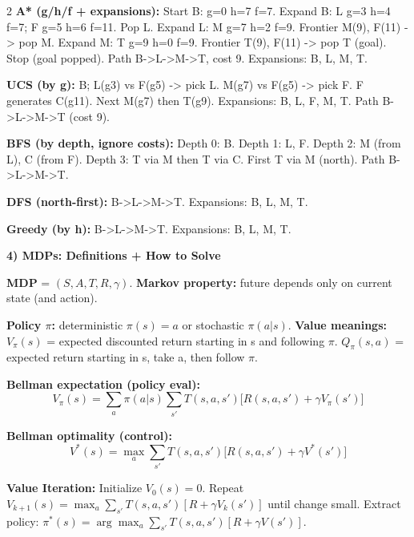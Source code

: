 \documentclass[10pt]{article}
\begin{document}
\begin{multicols*}{2}
\textbf{A* (g/h/f + expansions):}\newline
Start B: g=0 h=7 f=7.\newline
Expand B: L g=3 h=4 f=7; F g=5 h=6 f=11. Pop L.\newline
Expand L: M g=7 h=2 f=9. Frontier M(9), F(11) -> pop M.\newline
Expand M: T g=9 h=0 f=9. Frontier T(9), F(11) -> pop T (goal).\newline
Stop (goal popped). Path B->L->M->T, cost 9.\newline
Expansions: B, L, M, T.

\textbf{UCS (by g):}\newline
B; L(g3) vs F(g5) -> pick L. M(g7) vs F(g5) -> pick F. F generates C(g11). Next M(g7) then T(g9).\newline
Expansions: B, L, F, M, T. Path B->L->M->T (cost 9).

\textbf{BFS (by depth, ignore costs):}\newline
Depth 0: B. Depth 1: L, F. Depth 2: M (from L), C (from F). Depth 3: T via M then T via C. First T via M (north).\newline
Path B->L->M->T.

\textbf{DFS (north-first):} B->L->M->T. Expansions: B, L, M, T.

\textbf{Greedy (by h):} B->L->M->T. Expansions: B, L, M, T.

\textbf{4) MDPs: Definitions + How to Solve}

\textbf{MDP} = $(S, A, T, R, \gamma)$.\newline
\textbf{Markov property:} future depends only on current state (and action).

\textbf{Policy $\pi$:} deterministic $\pi(s)=a$ or stochastic $\pi(a|s)$.\newline
\textbf{Value meanings:}
$V_{\pi}(s)$ = expected discounted return starting in s and following $\pi$.\newline
$Q_{\pi}(s,a)$ = expected return starting in s, take a, then follow $\pi$.

\textbf{Bellman expectation (policy eval):}
\[V_{\pi}(s)=\sum_a \pi(a|s) \sum_{s'} T(s,a,s') \big[ R(s,a,s') + \gamma V_{\pi}(s') \big]\]

\textbf{Bellman optimality (control):}
\[V^*(s)=\max_a \sum_{s'} T(s,a,s') \big[ R(s,a,s') + \gamma V^*(s') \big]\]

\textbf{Value Iteration:}
Initialize $V_0(s)=0$. Repeat
$V_{k+1}(s)=\max_a \sum_{s'} T(s,a,s') [R + \gamma V_k(s')]$ until change small.\newline
Extract policy: $\pi^*(s)=\arg\max_a \sum_{s'} T(s,a,s') [R + \gamma V(s')]$.


\end{multicols*}
\end{document}
